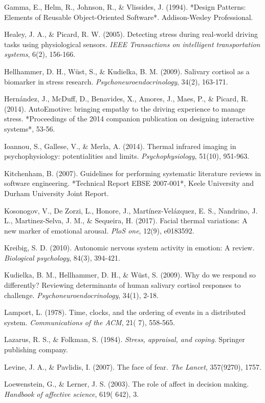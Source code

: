 \documentclass[11pt,a4paper]{article}
\begin{document}
Gamma, E., Helm, R., Johnson, R., \& Vlissides, J. (1994). *Design Patterns: Elements of Reusable Object-Oriented
Software*. Addison-Wesley Professional.

Healey, J. A., \& Picard, R. W. (2005). Detecting stress during real-world driving tasks using physiological sensors.
\textit{IEEE Transactions on intelligent transportation systems}, 6(2), 156-166.

Hellhammer, D. H., Wüst, S., \& Kudielka, B. M. (2009). Salivary cortisol as a biomarker in stress research.
\textit{Psychoneuroendocrinology}, 34(2), 163-171.

Hernández, J., McDuff, D., Benavides, X., Amores, J., Maes, P., \& Picard, R. (2014). AutoEmotive: bringing empathy to
the driving experience to manage stress. *Proceedings of the 2014 companion publication on designing interactive
systems*, 53-56.

Ioannou, S., Gallese, V., \& Merla, A. (2014). Thermal infrared imaging in psychophysiology: potentialities and limits.
\textit{Psychophysiology}, 51(10), 951-963.

Kitchenham, B. (2007). Guidelines for performing systematic literature reviews in software engineering. *Technical
Report EBSE 2007-001*, Keele University and Durham University Joint Report.

Kosonogov, V., De Zorzi, L., Honore, J., Martínez-Velázquez, E. S., Nandrino, J. L., Martinez-Selva, J. M., \& Sequeira,
H. (2017). Facial thermal variations: A new marker of emotional arousal. \textit{PloS one}, 12(9), e0183592.

Kreibig, S. D. (2010). Autonomic nervous system activity in emotion: A review. \textit{Biological psychology}, 84(3), 394-421.

Kudielka, B. M., Hellhammer, D. H., \& Wüst, S. (2009). Why do we respond so differently? Reviewing determinants of human
salivary cortisol responses to challenge. \textit{Psychoneuroendocrinology}, 34(1), 2-18.

Lamport, L. (1978). Time, clocks, and the ordering of events in a distributed system. \textit{Communications of the ACM}, 21(
7), 558-565.

Lazarus, R. S., \& Folkman, S. (1984). \textit{Stress, appraisal, and coping}. Springer publishing company.

Levine, J. A., \& Pavlidis, I. (2007). The face of fear. \textit{The Lancet}, 357(9270), 1757.

Loewenstein, G., \& Lerner, J. S. (2003). The role of affect in decision making. \textit{Handbook of affective science}, 619(
642), 3.
\end{document}

